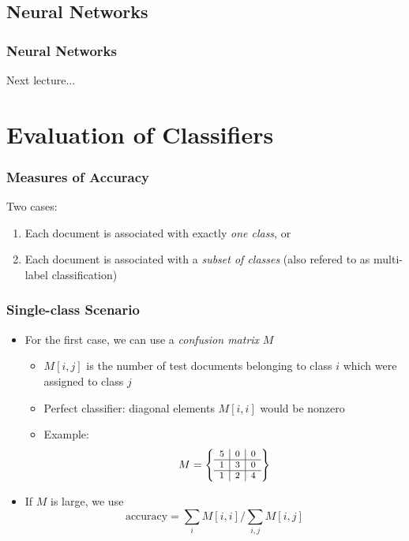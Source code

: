 \documentclass{beamer}
\begin{document}
\subsection{Neural Networks}

\begin{frame}
    \frametitle{Neural Networks}
    Next lecture...
\end{frame}


\section{Evaluation of Classifiers}

\begin{frame} \frametitle{Measures of Accuracy}
  Two cases:
  \begin{enumerate}
  \item Each document is associated with exactly \emph{one class}, or
  \item Each document is associated with a \emph{subset of classes} (also refered to as multi-label classification)
  \end{enumerate}
\end{frame}


\begin{frame} \frametitle{Single-class Scenario}
  \begin{itemize}
  \item For the first case, we can use a \emph{confusion matrix} $M$
    \begin{itemize}
    \item $M[i,j]$ is the number of test documents belonging to class $i$ which
      were assigned to class $j$
    \item Perfect classifier: diagonal elements $M[i,i]$ would be nonzero
    \item Example:
      \begin{displaymath}
        \footnotesize
        M = \left\{
          \begin{array}{c|c|c}
            5 & 0 & 0 \\\hline
            1 & 3 & 0 \\\hline
            1 & 2 & 4
          \end{array}
        \right\}
      \end{displaymath}
    \end{itemize}
  \item If $M$ is large, we use
    \begin{displaymath}
      \text{accuracy} = \sum_i M[i,i] / \sum_{i,j} M[i,j]
    \end{displaymath}
  \end{itemize}
\end{frame}
\end{document}
